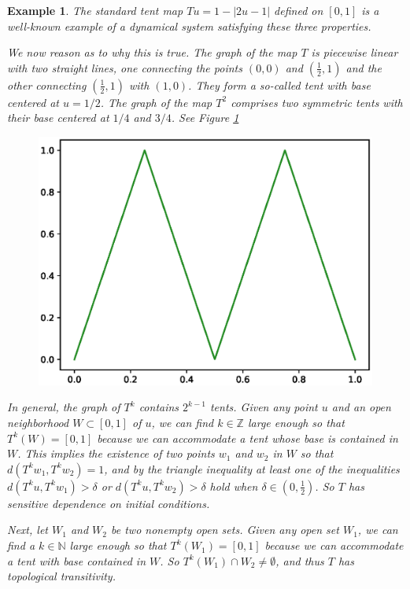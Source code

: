 \documentclass[a4paper,12pt,twoside]{report}
\newtheorem{Example}{Example}[]
\begin{document}
\begin{Example} 
  The standard tent map $Tu=1-|2u-1|$ defined on $[0,1]$ is a well-known example of a dynamical system satisfying these three properties. 

  We now reason as to why this is true. The graph of the map $T$ is piecewise linear with two straight lines, one connecting the points $(0,0)$ and $(\frac{1}{2},1)$ and the other connecting $(\frac{1}{2},1)$ with $(1,0)$. They form a so-called tent with base centered at $u=1/2$. The graph of the map $T^2$ comprises two symmetric tents with their base centered at $1/4$ and $3/4$. See Figure \ref{fig:T2tentmap}

  \begin{figure}[ht]
    \includegraphics[scale=0.6]{_tentmap_2.eps}
        \centering
        \label{fig:T2tentmap}
  \end{figure}
  
  In general, the graph of  $T^k$ contains $2^{k-1}$ tents.
  Given any point $u$ and an open neighborhood $W \subset[0,1]$ of $u$, we can find $k\in\mathbb{Z}$ large enough so that $T^k(W) = [0,1]$ because we can accommodate a tent whose base is contained in $W$.
  This implies the existence of two points $w_1$ and $w_2$ in $W$ so that $d(T^kw_1,T^kw_2)= 1$, and by the triangle inequality  at least one of the inequalities $d(T^ku,T^kw_1)> \delta$ or $d(T^ku,T^kw_2)> \delta$ hold when $\delta\in (0,\frac{1}{2})$.  So $T$ has sensitive dependence on initial conditions.
  
  Next, let $W_1$ and $W_2$ be two nonempty open sets. Given any open set $W_1$, we can find a $k\in\mathbb{N}$ large enough so that $T^k(W_1) = [0,1]$ because we can accommodate a tent with base contained in $W$. So $T^k(W_1) \cap W_2 \not=\emptyset$, and thus $T$ has topological transitivity.
  

\end{Example}
\end{document}
